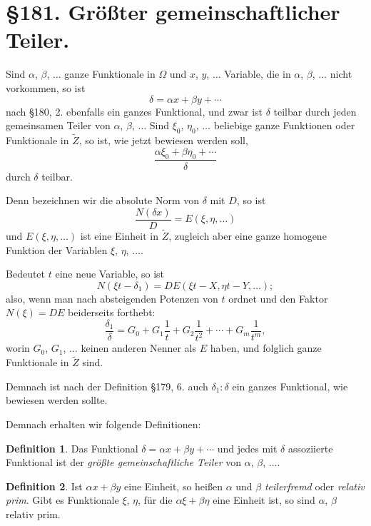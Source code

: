 \documentclass[12pt,a4paper]{article}
\theoremstyle{definition}
\newtheorem{defin}{Definition}[section]
\begin{document}
\newpage
\section*{\S 181. Größter gemeinschaftlicher Teiler.}

Sind $\alpha$, $\beta$, $\ldots$ ganze Funktionale in $\Omega$ und $x$, $y$, $\ldots$ Variable, die in $\alpha$, $\beta$, $\ldots$ nicht vorkommen, so ist
\begin{equation}
\delta = \alpha x + \beta y + \cdots
\end{equation}
nach \S 180, 2. ebenfalls ein ganzes Funktional, und zwar ist $\delta$ teilbar durch jeden gemeinsamen Teiler von $\alpha$, $\beta$, $\ldots$ Sind $\xi_0$, $\eta_0$, $\ldots$ beliebige ganze Funktionen oder Funktionale in $\tilde{Z}$, so ist, wie jetzt bewiesen werden soll,
\begin{equation}
\frac{\alpha\xi_0 + \beta\eta_0 + \cdots}{\delta}
\end{equation}
durch $\delta$ teilbar.

Denn bezeichnen wir die absolute Norm von $\delta$ mit $D$, so ist
\begin{equation}
\frac{N(\delta x)}{D} = E(\xi, \eta, \ldots)
\end{equation}
und $E(\xi, \eta, \ldots)$ ist eine Einheit in $\tilde{Z}$, zugleich aber eine ganze homogene Funktion der Variablen $\xi$, $\eta$, $\ldots$.

Bedeutet $t$ eine neue Variable, so ist
\[N(\xi t - \delta_1) = DE(\xi t - X, \eta t - Y, \ldots);\]
also, wenn man nach absteigenden Potenzen von $t$ ordnet und den Faktor $N(\xi) = DE$ beiderseits forthebt:
\[\frac{\delta_1}{\delta} = G_0 + G_1 \frac{1}{t} + G_2 \frac{1}{t^2} + \cdots + G_m \frac{1}{t^m},\]
worin $G_0$, $G_1$, $\ldots$ keinen anderen Nenner als $E$ haben, und folglich ganze Funktionale in $\tilde{Z}$ sind.

Demnach ist nach der Definition \S 179, 6. auch $\delta_1:\delta$ ein ganzes Funktional, wie bewiesen werden sollte.

Demnach erhalten wir folgende Definitionen:

\begin{defin}
Das Funktional $\delta = \alpha x + \beta y + \cdots$ und jedes mit $\delta$ assoziierte Funktional ist der \emph{größte gemeinschaftliche Teiler} von $\alpha$, $\beta$, $\ldots$.
\end{defin}

\begin{defin}
Ist $\alpha x + \beta y$ eine Einheit, so heißen $\alpha$ und $\beta$ \emph{teilerfremd} oder \emph{relativ prim}. Gibt es Funktionale $\xi$, $\eta$, für die $\alpha\xi + \beta\eta$ eine Einheit ist, so sind $\alpha$, $\beta$ relativ prim.
\end{defin}
\end{document}
